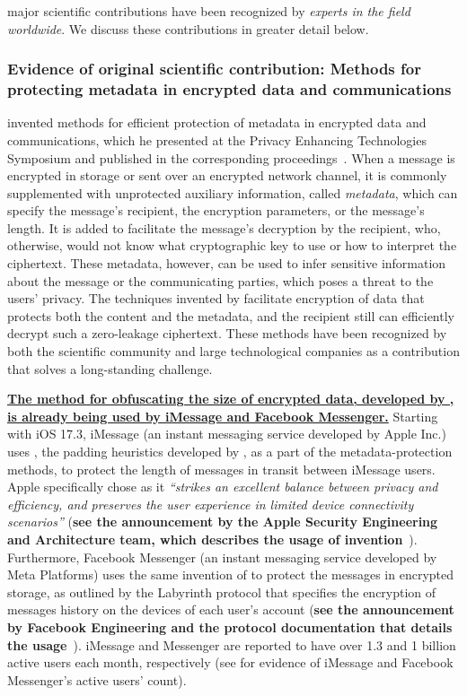 \drs major scientific contributions have been recognized by \textit{experts in
the field worldwide}.
We discuss these contributions in greater detail below.

\subsubsection{Evidence of original scientific contribution: Methods for 
protecting metadata in encrypted data and communications}
\label{sec:purbs}

\dr invented methods for efficient
protection of metadata in encrypted data and communications, which he
presented at the Privacy Enhancing Technologies Symposium and published in the
corresponding proceedings~\cite{purbs}.
When a message is encrypted in storage or sent over an encrypted network
channel, it is commonly supplemented with unprotected auxiliary information,
called \textit{metadata}, which can specify the message's recipient, the
encryption parameters, or the message's length.
It is added to facilitate the message's decryption by the recipient, who,
otherwise, would not know what cryptographic key to use or how to interpret the
ciphertext.
These metadata, however, can be used to infer sensitive information about the
message or the communicating parties, which poses a threat to the users'
privacy.
The techniques invented by \dr facilitate encryption of data that protects
both the content and the metadata, and the recipient still can
efficiently decrypt such a zero-leakage ciphertext.
These methods have been recognized by both the scientific community and
large technological companies as a contribution that solves a
long-standing challenge.

\textbf{\uline{The method for obfuscating the size of encrypted data,
developed by \dr, is already being used by iMessage and Facebook Messenger.}}
Starting with iOS 17.3, iMessage (an instant messaging service developed by
Apple Inc.\@) uses \padme, the padding heuristics developed
by \dr, as a part of the metadata-protection methods, to protect the length of
messages in transit between iMessage users.
Apple specifically chose \padme as it \textit{``strikes an excellent
balance between privacy and efficiency, and preserves the user experience in
limited device connectivity scenarios''} (\textbf{see the announcement by the
Apple Security Engineering and Architecture team, which describes the usage of
\drs invention}~\cite{purbs}).
Furthermore, Facebook Messenger (an instant messaging service developed by Meta
Platforms) uses the same invention of \dr to protect the messages in encrypted
storage, as outlined by the Labyrinth protocol that specifies the encryption of
messages history on the devices of each user's account (\textbf{see the
announcement by Facebook Engineering and the protocol documentation that details
the usage}~\cite{purbs}).
iMessage and Messenger are reported to have over 1.3 and 1 billion
active users each month, respectively (see  for evidence of
iMessage and Facebook Messenger's active users' count).

